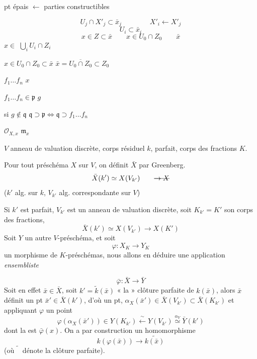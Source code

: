 \documentclass[11pt,a4paper]{article}
\begin{document}
\ill{} pt épais $\longleftarrow$ parties constructibles 

\[
  U_j \cap X'_j \subset \bar{x}_j \qquad\qquad X'_i \longleftarrow X'_j
\]
\[
  U_i \subset \bar{x}_i
\]
\[
  x \in Z \subset \bar{x} \qquad x \in U_0 \cap Z_0 \qquad \bar{x}
\]
$x \in$  $\bigcup_i U_i \cap Z_i$

$x \in U_0 \cap Z_0 \subset \bar{x}$ \qquad $\bar{x} = \overline{U_0 \cap Z_0} \subset Z_0$


\struck{\ill{}} $f_1 \ldots f_n$  $x$

$f_1 \ldots f_n \in \mathfrak{p}$ \qquad $g$

si $g \notin \mathfrak{q}$ \qquad $\mathfrak{q} \supset \mathfrak{p} \Longleftrightarrow \mathfrak{q} \supset f_1 \ldots f_n$


$\mathcal{O}_{X,x}$ \qquad $\mathfrak{m}_x$ \qquad \ill{}

$V$ anneau de valuation discrète, corps résiduel $k$, parfait, corps des fractions $K$.

Pour tout préschéma $X$ sur $V$, on définit $\bar{X}$ par Greenberg.
\[
  \bar{X}(k') \simeq X(V_{k'}) \qquad \text{\struck{$\to X$}}
\]
($k'$ alg. sur $k$, $V_{k'}$ alg. correspondante sur $V$)

Si $k'$ est parfait, $V_{k'}$ est un anneau de valuation discrète, soit $K_{k'} = K'$ son corps des fractions, 
\[
  \bar{X}(k') \simeq X(V_{k'}) \longrightarrow X(K')
\]
Soit  $Y$ un autre $V$-préschéma,  et soit
\[
  \varphi : X_K \longrightarrow Y_K
\]
un morphisme de $K$-préschémas, nous allons en déduire une application \emph{ensembliste}

\[
  \bar{\varphi} : \bar{X} \longrightarrow \bar{Y}
\]
Soit en effet $\bar{x} \in \bar{X}$, soit $k' = \tilde{k}(\bar{x})$ « la » clôture parfaite de $k(\bar{x})$, alors $\bar{x}$ définit un pt $\bar{x}' \in \bar{X}(k')$, d'où un pt, \struck{\ill{}} $\alpha_X(\bar{x}') \in \bar{X}(V_{k'}) \subset \bar{X}(K_{k'})$ et appliquant $\varphi$ un point
\[
  \varphi(\alpha_X(\bar{x}')) \in Y(K_{k'}) \xleftarrow{\ \sim\ } Y(V_{k'}) \overset{\alpha_Y}{\simeq} \bar{Y}(k')
\]
dont la  est  $\bar{\varphi}(x)$. On a \ill{} \ill{} par construction un homomorphisme
\[
  k(\varphi(\bar{x})) \longrightarrow \widetilde{k(\bar{x})}
\]
(où $\widetilde{\phantom{k}}$ dénote la clôture parfaite).
\end{document}
